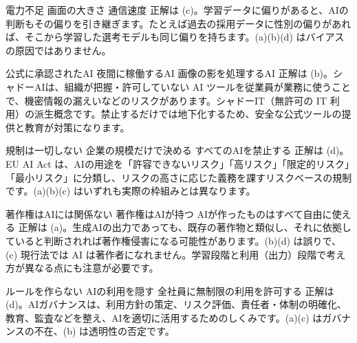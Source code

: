 
%
  {電力不足}%
  {画面の大きさ}%
  {}%
  {通信速度}%
  {正解は (c)。学習データに偏りがあると、AIの判断もその偏りを引き継ぎます。たとえば過去の採用データに性別の偏りがあれば、そこから学習した選考モデルも同じ偏りを持ちます。(a)(b)(d) はバイアスの原因ではありません。}

%
  {公式に承認されたAI}%
  {}%
  {夜間に稼働するAI}%
  {画像の影を処理するAI}%
  {正解は (b)。シャドーAIは、組織が把握・許可していない AI ツールを従業員が業務に使うことで、機密情報の漏えいなどのリスクがあります。シャドーIT（無許可の IT 利用）の派生概念です。禁止するだけでは地下化するため、安全な公式ツールの提供と教育が対策になります。}

%
  {規制は一切しない}%
  {企業の規模だけで決める}%
  {すべてのAIを禁止する}%
  {}%
  {正解は (d)。EU AI Act は、AIの用途を「許容できないリスク」「高リスク」「限定的リスク」「最小リスク」に分類し、リスクの高さに応じた義務を課すリスクベースの規制です。(a)(b)(c) はいずれも実際の枠組みとは異なります。}

%
  {}%
  {著作権はAIには関係ない}%
  {著作権はAIが持つ}%
  {AIが作ったものはすべて自由に使える}%
  {正解は (a)。生成AIの出力であっても、既存の著作物と類似し、それに依拠していると判断されれば著作権侵害になる可能性があります。(b)(d) は誤りで、(c) 現行法では AI は著作者になれません。学習段階と利用（出力）段階で考え方が異なる点にも注意が必要です。}

%
  {ルールを作らない}%
  {AIの利用を隠す}%
  {全社員に無制限の利用を許可する}%
  {}%
  {正解は (d)。AIガバナンスは、利用方針の策定、リスク評価、責任者・体制の明確化、教育、監査などを整え、AIを適切に活用するためのしくみです。(a)(c) はガバナンスの不在、(b) は透明性の否定です。}
